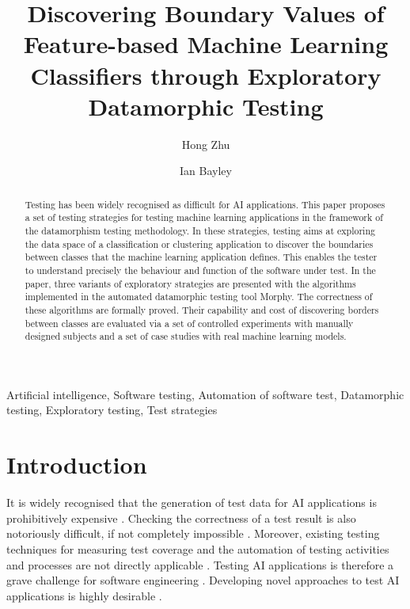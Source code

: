 \documentclass[preprint,1p,authoryear,times]{elsarticle}
\begin{document}
 

\begin{frontmatter}

\title{Discovering Boundary Values of Feature-based Machine Learning Classifiers through Exploratory Datamorphic Testing}

\author{Hong Zhu}
\author{Ian Bayley}

\address{School of Engineering, Computing and Mathematics, Oxford Brookes University, Oxford OX33 1HX, United Kingdom}


\begin{abstract}
Testing has been widely recognised as difficult for AI applications. This paper proposes a set of testing strategies for testing machine learning applications in the framework of the datamorphism testing methodology. In these strategies, testing aims at exploring the data space of a classification or clustering application to discover the boundaries between classes that the machine learning application defines. This enables the tester to understand precisely the behaviour and function of the software under test. In the paper, three variants of exploratory strategies are presented with the algorithms implemented in the automated datamorphic testing tool Morphy. The correctness of these algorithms are formally proved. Their capability and cost of discovering borders between classes are evaluated via a set of controlled experiments with manually designed subjects and a set of case studies with real machine learning models. 
\end{abstract}

\begin{keyword}
Artificial intelligence, Software testing, Automation of software test, Datamorphic testing, Exploratory testing, Test strategies
\end{keyword}

\end{frontmatter}


\section{Introduction}

It is widely recognised that the generation of test data for AI applications is prohibitively expensive \citep{DeepTest2018}. Checking the correctness of a test result is also notoriously difficult, if not completely impossible \citep{Zhou2018Untestable, Zhou2019DriverlessCar}. Moreover, existing testing techniques for measuring test coverage and the automation of testing activities and processes are not directly applicable \citep{DatamorphicTR2019}. Testing AI applications is therefore a grave challenge for software engineering \citep{AST2018Proc}. Developing novel approaches to test AI applications is highly desirable \citep{AITest2019Proc}. 
\end{document}
